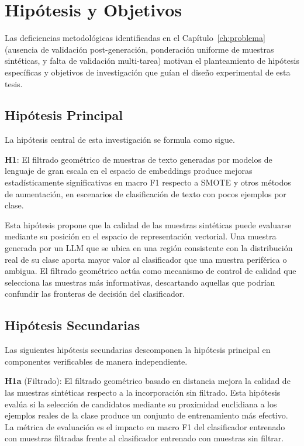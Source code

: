 
\chapter{Hipótesis y Objetivos}
\label{ch:hipotesis}

Las deficiencias metodológicas identificadas en el Capítulo~\ref{ch:problema} (ausencia de validación post-generación, ponderación uniforme de muestras sintéticas, y falta de validación multi-tarea) motivan el planteamiento de hipótesis específicas y objetivos de investigación que guían el diseño experimental de esta tesis.

\section{Hipótesis Principal}
\label{sec:hipotesis_principal}

La hipótesis central de esta investigación se formula como sigue.

\textbf{H1}: El filtrado geométrico de muestras de texto generadas por modelos de lenguaje de gran escala en el espacio de embeddings produce mejoras estadísticamente significativas en macro F1 respecto a SMOTE y otros métodos de aumentación, en escenarios de clasificación de texto con pocos ejemplos por clase.

Esta hipótesis propone que la calidad de las muestras sintéticas puede evaluarse mediante su posición en el espacio de representación vectorial. Una muestra generada por un LLM que se ubica en una región consistente con la distribución real de su clase aporta mayor valor al clasificador que una muestra periférica o ambigua. El filtrado geométrico actúa como mecanismo de control de calidad que selecciona las muestras más informativas, descartando aquellas que podrían confundir las fronteras de decisión del clasificador.

\section{Hipótesis Secundarias}
\label{sec:hipotesis_secundarias}

Las siguientes hipótesis secundarias descomponen la hipótesis principal en componentes verificables de manera independiente.

\textbf{H1a} (Filtrado): El filtrado geométrico basado en distancia mejora la calidad de las muestras sintéticas respecto a la incorporación sin filtrado. Esta hipótesis evalúa si la selección de candidatos mediante su proximidad euclidiana a los ejemplos reales de la clase produce un conjunto de entrenamiento más efectivo. La métrica de evaluación es el impacto en macro F1 del clasificador entrenado con muestras filtradas frente al clasificador entrenado con muestras sin filtrar.

